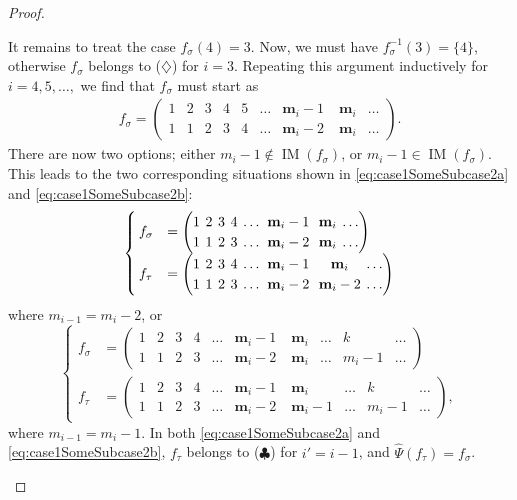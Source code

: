 \documentclass[reqno]{amsart}
\theoremstyle{definition}
\newcommand{\fretherD}{\hat{\Psi}}
\newcommand{\caseThree}{\ensuremath{\diamondsuit}}
\newcommand{\caseFour}{\ensuremath{\clubsuit}}
\newcommand{\img}{\mathbf{m}}
\DeclareMathOperator{\supp}{IM}
\begin{document}
\begin{proof}
\begin{enumerate}[leftmargin=1.6cm]
\begin{itemize}[leftmargin=-1cm]
			\medskip 
			It remains to treat the case $f_\sigma(4)=3$.
			Now, we must have $f_\sigma^{-1}(3)=\{4\}$, otherwise
			$f_\sigma$ belongs to (\caseThree) for $i=3$. 
			Repeating this argument inductively for $i=4,5,\dotsc,$
			we find that $f_\sigma$ must start as
			\begingroup %
			\setlength\arraycolsep{2pt}
			\begin{align*}
			f_\sigma = 
			\begin{pmatrix}
			1 & 2 & 3 & 4 & 5& \dotsc & \img_i-1\; & \img_i & \dotsc \\
			1 & 1 & 2 & 3 & 4& \dotsc & \img_i-2\; & \img_i & \dotsc   
			\end{pmatrix}.
			\end{align*}
			\endgroup
			There are now two options; either $m_i-1 \notin \supp(f_\sigma)$, or  $m_i-1 \in \supp(f_\sigma)$.
			This leads to the two corresponding situations shown in 
			\eqref{eq:case1SomeSubcase2a} and \eqref{eq:case1SomeSubcase2b}:
			\begingroup %
			\begin{equation}\label{eq:case1SomeSubcase2a}
			\setlength\arraycolsep{2pt}
			\begin{cases}
				f_\sigma &= 
				\begin{pmatrix}
				1 & 2 & 3 & 4 & \dotsc & \img_i-1\;& \img_i & \dotsc \\
				1 & 1 & 2 & 3 & \dotsc & \img_i-2\;& \img_i & \dotsc 
				\end{pmatrix} \\
				f_\tau &= 
				\begin{pmatrix}
					1 & 2 & 3 & 4 & \dotsc & \img_i-1\;& \img_i   & \dotsc \\
					1 & 1 & 2 & 3 & \dotsc & \img_i-2\;& \img_i-2 & \dotsc 
				\end{pmatrix}
			\end{cases}
			\end{equation}
			where $m_{i-1} = m_i-2$, or
			\begin{equation}\label{eq:case1SomeSubcase2b}
			\begin{cases}
			f_\sigma &= 
			\begin{pmatrix}
			1 & 2 & 3 & 4 & \dotsc & \img_i-1\;& \img_i & \dotsc & k     & \dotsc\\
			1 & 1 & 2 & 3 & \dotsc & \img_i-2\;& \img_i & \dotsc & m_i-1 & \dotsc
			\end{pmatrix} \\
			f_\tau &= 
			\begin{pmatrix}
			1 & 2 & 3 & 4 & \dotsc & \img_i-1\;& \img_i &   \dotsc & k     & \dotsc\\
			1 & 1 & 2 & 3 & \dotsc & \img_i-2\;& \img_i-1 & \dotsc & m_i-1 & \dotsc
			\end{pmatrix},
			\end{cases}
			\end{equation}
			\endgroup
			where $m_{i-1} = m_i-1$. In both \eqref{eq:case1SomeSubcase2a} and \eqref{eq:case1SomeSubcase2b},
			$f_\tau$ belongs to (\caseFour) for $i'=i-1$, and $\fretherD(f_\tau)=f_\sigma$.
			

\end{itemize}
\end{enumerate}
\end{proof}
\end{document}

